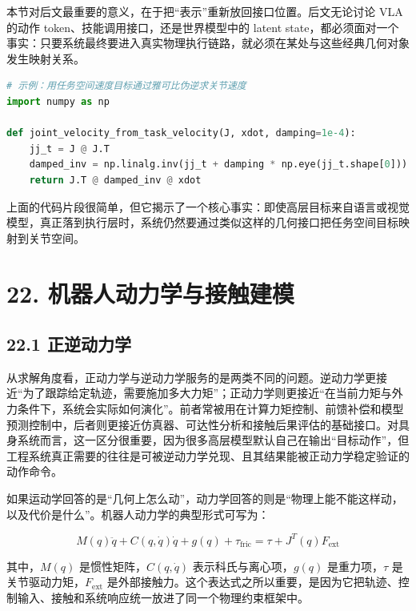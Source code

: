 本节对后文最重要的意义，在于把“表示”重新放回接口位置。后文无论讨论 VLA 的动作 token、技能调用接口，还是世界模型中的 latent state，都必须面对一个事实：只要系统最终要进入真实物理执行链路，就必须在某处与这些经典几何对象发生映射关系。

\begin{lstlisting}[language=python]
# 示例：用任务空间速度目标通过雅可比伪逆求关节速度
import numpy as np

def joint_velocity_from_task_velocity(J, xdot, damping=1e-4):
    jj_t = J @ J.T
    damped_inv = np.linalg.inv(jj_t + damping * np.eye(jj_t.shape[0]))
    return J.T @ damped_inv @ xdot
\end{lstlisting}

上面的代码片段很简单，但它揭示了一个核心事实：即使高层目标来自语言或视觉模型，真正落到执行层时，系统仍然要通过类似这样的几何接口把任务空间目标映射到关节空间。

\section*{22. 机器人动力学与接触建模}

\subsection*{22.1 正逆动力学}


从求解角度看，正动力学与逆动力学服务的是两类不同的问题。逆动力学更接近“为了跟踪给定轨迹，需要施加多大力矩”；正动力学则更接近“在当前力矩与外力条件下，系统会实际如何演化”。前者常被用在计算力矩控制、前馈补偿和模型预测控制中，后者则更接近仿真器、可达性分析和接触后果评估的基础接口。对具身系统而言，这一区分很重要，因为很多高层模型默认自己在输出“目标动作”，但工程系统真正需要的往往是可被逆动力学兑现、且其结果能被正动力学稳定验证的动作命令。

如果运动学回答的是“几何上怎么动”，动力学回答的则是“物理上能不能这样动，以及代价是什么”。机器人动力学的典型形式可写为：

\begingroup
\scriptsize
\begin{equation*}
M(q)\ddot{q} + C(q,\dot{q})\dot{q} + g(q) + \tau_{\mathrm{fric}} = \tau + J^T(q)F_{\mathrm{ext}}
\end{equation*}
\endgroup

其中，\(M(q)\) 是惯性矩阵，\(C(q,\dot{q})\) 表示科氏与离心项，\(g(q)\) 是重力项，\(\tau\) 是关节驱动力矩，\(F_{\mathrm{ext}}\) 是外部接触力。这个表达式之所以重要，是因为它把轨迹、控制输入、接触和系统响应统一放进了同一个物理约束框架中。

